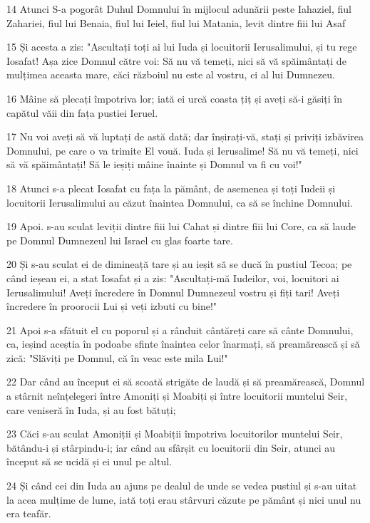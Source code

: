 \par 14 Atunci S-a pogorât Duhul Domnului în mijlocul adunării peste Iahaziel, fiul Zahariei, fiul lui Benaia, fiul lui Ieiel, fiul lui Matania, levit dintre fiii lui Asaf
\par 15 Și acesta a zis: "Ascultați toți ai lui Iuda și locuitorii Ierusalimului, și tu rege Iosafat! Așa zice Domnul către voi: Să nu vă temeți, nici să vă spăimântați de mulțimea aceasta mare, căci războiul nu este al vostru, ci al lui Dumnezeu.
\par 16 Mâine să plecați împotriva lor; iată ei urcă coasta țiț și aveți să-i găsiți în capătul văii din fața pustiei Ieruel.
\par 17 Nu voi aveți să vă luptați de astă dată; dar înșirați-vă, stați și priviți izbăvirea Domnului, pe care o va trimite El vouă. Iuda și Ierusalime! Să nu vă temeți, nici să vă spăimântați! Să le ieșiți mâine înainte și Domnul va fi cu voi!"
\par 18 Atunci s-a plecat Iosafat cu fața la pământ, de asemenea și toți Iudeii și locuitorii Ierusalimului au căzut înaintea Domnului, ca să se închine Domnului.
\par 19 Apoi. s-au sculat leviții dintre fiii lui Cahat și dintre fiii lui Core, ca să laude pe Domnul Dumnezeul lui Israel cu glas foarte tare.
\par 20 Și s-au sculat ei de dimineață tare și au ieșit să se ducă în pustiul Tecoa; pe când ieșeau ei, a stat Iosafat și a zis: "Ascultați-mă Iudeilor, voi, locuitori ai Ierusalimului! Aveți încredere în Domnul Dumnezeul vostru și fiți tari! Aveți încredere în proorocii Lui și veți izbuti cu bine!"
\par 21 Apoi s-a sfătuit el cu poporul și a rânduit cântăreți care să cânte Domnului, ca, ieșind aceștia în podoabe sfinte înaintea celor înarmați, să preamărească și să zică: "Slăviți pe Domnul, că în veac este mila Lui!"
\par 22 Dar când au început ei să scoată strigăte de laudă și să preamărească, Domnul a stârnit neînțelegeri între Amoniți și Moabiți și între locuitorii muntelui Seir, care veniseră în Iuda, și au fost bătuți;
\par 23 Căci s-au sculat Amoniții și Moabiții împotriva locuitorilor muntelui Seir, bătându-i și stârpindu-i; iar când au sfârșit cu locuitorii din Seir, atunci au început să se ucidă și ei unul pe altul.
\par 24 Și când cei din Iuda au ajuns pe dealul de unde se vedea pustiul și s-au uitat la acea mulțime de lume, iată toți erau stârvuri căzute pe pământ și nici unul nu era teafăr.
